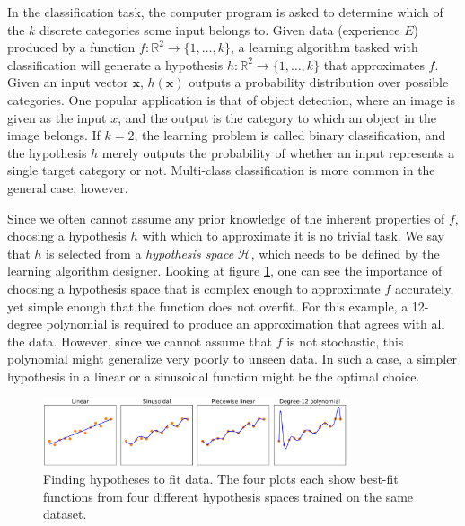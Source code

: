 In the classification task, the computer program is asked to determine which of the $k$ discrete categories some input belongs to. Given data (experience $E$) produced by a function $f:\mathbb{R}^{2}\to\{1,\dots,k\}$, a learning algorithm tasked with classification will generate a hypothesis $h:\mathbb{R}^{2}\to\{1,\dots,k\}$ that approximates $f$. Given an input vector $\mathbf{x}$, $h(\mathbf{x})$ outputs a probability distribution over possible categories. One popular application is that of object detection, where an image is given as the input $x$, and the output is the category to which an object in the image belongs. If $k=2$, the learning problem is called binary classification, and the hypothesis $h$ merely outputs the probability of whether an input represents a single target category or not. Multi-class classification is more common in the general case, however. 


Since we often cannot assume any prior knowledge of the inherent properties of $f$, choosing a hypothesis $h$ with which to approximate it is no trivial task. We say that $h$ is selected from a \textit{hypothesis space} $\mathcal{H}$, which needs to be defined by the learning algorithm designer. Looking at figure \ref{fig:bt_hypotheses}, one can see the importance of choosing a hypothesis space that is complex enough to approximate $f$ accurately, yet simple enough that the function does not overfit. For this example, a 12-degree polynomial is required to produce an approximation that agrees with all the data. However, since we cannot assume that $f$ is not stochastic, this polynomial might generalize very poorly to unseen data. In such a case, a simpler hypothesis in a linear or a sinusoidal function might be the optimal choice.

\begin{figure}[h]
    \centering
    \includegraphics[width=0.8\textwidth]{Images/bt_hypotheses.png}
    \caption{Finding hypotheses to fit data. The four plots each show best-fit functions from four different hypothesis spaces trained on the same dataset.}
    \label{fig:bt_hypotheses}
\end{figure}

